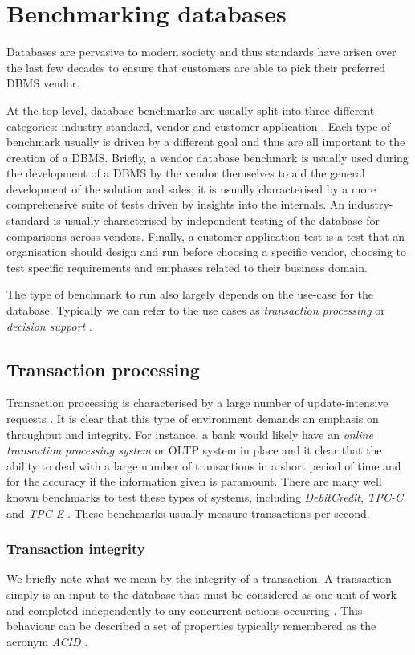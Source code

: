 \section{Benchmarking databases}
Databases are pervasive to modern society and thus standards have arisen over
the last few decades to ensure that customers are able to pick their preferred
DBMS vendor.

At the top level, database benchmarks are usually split into three different
categories: industry-standard, vendor and
customer-application \cite{PractitionersIntroduction}. Each type of benchmark
usually is driven by a different goal and thus are all important to the creation
of a DBMS. Briefly, a vendor database benchmark is usually used during the
development of a DBMS by the vendor themselves to aid
the general development of the solution and sales; it is usually characterised
by a more comprehensive suite of tests driven by insights into the internals. An
industry-standard is usually characterised by independent testing of the
database for comparisons across vendors. Finally, a customer-application test is
a test that an organisation should design and run before choosing a specific
vendor, choosing to test specific requirements and emphases related to their
business domain.


The type of benchmark to run also largely depends on the use-case for the
database. Typically we can refer to the use cases as \emph{transaction
processing} or \emph{decision support} \cite{PractitionersIntroduction}.

\subsection{Transaction processing}
Transaction processing is characterised by a large number of
update-intensive requests
\cite{PractitionersIntroduction}. It is clear that this type of environment
demands an emphasis on throughput and integrity. For instance, a bank would
likely have an \emph{online transaction processing system} or OLTP system in
place and it clear that the ability to deal with a large number of transactions
in a short period of time and for the accuracy if the information given is
paramount. There are many well known benchmarks to test these types of systems,
including \emph{DebitCredit}, \emph{TPC-C} and \emph{TPC-E} \cite{TPC-OLTP}.
These benchmarks usually measure transactions per second.

\subsubsection{Transaction integrity}
We briefly note what we mean by the integrity of a transaction. A transaction
simply is an input to the database that must be considered as one unit of work
\cite{ComputerScienceDictionary} and completed independently to any concurrent
actions occurring \cite{}. This behaviour can be described a set of
properties typically remembered as the acronym \emph{ACID}
\cite{ComputerScienceDictionary, PractitionersIntroduction}.
